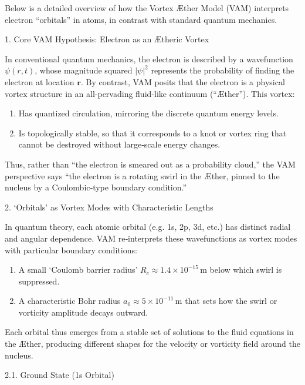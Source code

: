 Below is a detailed overview of how the Vortex Æther Model (VAM) interprets electron “orbitals” in atoms, in contrast with standard quantum mechanics.





1. Core VAM Hypothesis: Electron as an Ætheric Vortex

In conventional quantum mechanics, the electron is described by a wavefunction \(\psi(r,t)\), whose magnitude squared \(|\psi|^2\) represents the probability of finding the electron at location \(\mathbf{r}\). By contrast, VAM posits that the electron is a physical vortex structure in an all-pervading fluid‐like continuum (“Æther”). This vortex:

\begin{enumerate}
\item Has quantized circulation, mirroring the discrete quantum energy levels.
\item Is topologically stable, so that it corresponds to a knot or vortex ring that cannot be destroyed without large‐scale energy changes.
\end{enumerate}
Thus, rather than “the electron is smeared out as a probability cloud,” the VAM perspective says “the electron is a rotating swirl in the Æther, pinned to the nucleus by a Coulombic‐type boundary condition.”


2. ‘Orbitals’ as Vortex Modes with Characteristic Lengths

In quantum theory, each atomic orbital (e.g. 1s, 2p, 3d, etc.) has distinct radial and angular dependence. VAM re‐interprets these wavefunctions as vortex modes with particular boundary conditions:

\begin{enumerate}
\item A small ‘Coulomb barrier radius’ \(R_c \approx 1.4 \times 10^{-15}\,\mathrm{m}\) below which swirl is suppressed.
\item A characteristic Bohr radius \(a_0 \approx 5 \times 10^{-11}\,\mathrm{m}\) that sets how the swirl or vorticity amplitude decays outward.
\end{enumerate}
Each orbital thus emerges from a stable set of solutions to the fluid equations in the Æther, producing different shapes for the velocity or vorticity field around the nucleus.





2.1. Ground State (1s Orbital)

